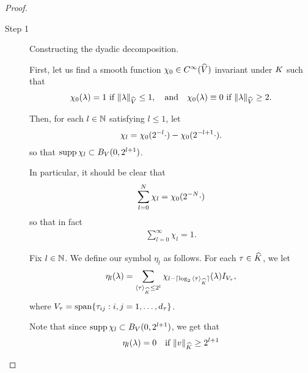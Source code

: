 \begin{proof}
    \begin{description}
        \item[Step 1] Constructing the dyadic decomposition.

            First, let us find a smooth function $\chi_0 \in {C^\infty({\widehat{V}})}$ invariant under $K$ such that
            \begin{align*}
                \chi_0(\lambda) = 1 \  \text{if}\  \norm[\dualGroup{\VectorSpace}]{\lambda} \leq 1, \quad \text{and} \quad
                \chi_0(\lambda) \equiv 0 \ \text{if}\  \norm[\dualGroup{\VectorSpace}]{\lambda} \geq 2.
            \end{align*}

            Then, for each $l \in \mathbb{N}$ satisfying $l \leq 1$, let
            \begin{align*}
                \chi_l = \chi_0(2^{-l} \cdot) - \chi_0(2^{-l + 1} \cdot).
            \end{align*}
            so that $\operatorname{supp} \chi_l \subset {B_{V} (0, 2^{l + 1})}$.

            In particular, it should be clear that
            \begin{align*}
                \sum_{l = 0}^N \chi_l = \chi_0(2^{-N} \cdot)
            \end{align*}
            so that in fact
            \begin{align}
                \sum_{l = 0}^\infty \chi_l = 1.
                \label{eq:theorem:Littlewood-Paley_decomposition:partition_of_unity}
            \end{align}

            Fix $l \in \mathbb{N}$.
            We define our symbol $\eta_l$ as follows.
            For each $\tau \in {\widehat{K}}$, we let
            \begin{align*}
                \eta_l(\lambda)
                = \sum_{{\langle \tau \rangle}_{{\widehat{K}}} \leq 2^l}
                \chi_{l - \lceil\log_2 {\langle \tau \rangle}_{{\widehat{K}}}\rceil}(\lambda) {I_{V_\tau}},
            \end{align*}
            where $V_\tau = \operatorname{span} \{ \tau_{ij} : i, j = 1, \dots, {d_{\tau}} \}$.

            Note that since $\operatorname{supp} \chi_l \subset {B_{V} (0, 2^{l + 1})}$,
            we get that
            \begin{align}
                \eta_l(\lambda) = 0 \quad \text{if } \norm[\dualGroup{\CompactGroup}]{v} \geq 2^{l + 1}
                \label{eq:theorem:Littlewood-Paley_decomposition:cancellation_condition}
            \end{align}


\end{description}
\end{proof}
